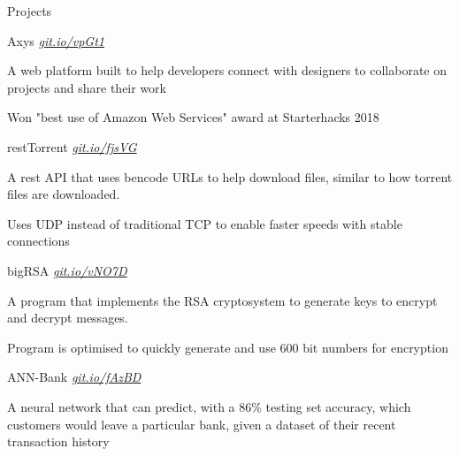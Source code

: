 \documentclass{resume} %
\begin{document}
\begin{rSection}{Projects}
  
  \begin{rSubsection}{Axys}
	  {\em {\href{https://github.com/MSJawad/AXYS}
		    {git.io/vpGt1}}}
	  {}

    \item A web platform built to help developers connect with designers to collaborate on projects and share their work
    \item Won "best use of Amazon Web Services" award at Starterhacks 2018
      
  \end{rSubsection}

	\begin{rSubsection}{restTorrent}
		{\em {\href{https://github.com/MSJawad/restTorrent}
				{git.io/fjsVG}}}
		{}
		
		\item A rest API that uses bencode URLs to help download files, similar to how torrent files are downloaded.
		\item Uses UDP instead of traditional TCP to enable faster speeds with stable connections
		
	\end{rSubsection}

  \begin{rSubsection}{bigRSA}
	  {\em {\href{https://github.com/MSJawad/bigRSA}
		    {git.io/vNO7D}}}
	  {}

    \item A program that implements the RSA cryptosystem to generate keys to encrypt and decrypt messages.
    \item Program is optimised to quickly generate and use 600 bit numbers for encryption
    
    \end{rSubsection}
    
   \begin{rSubsection}{ANN-Bank}
	  {\em {\href{https://github.com/MSJawad/ANN-Bank-Solutions}
		    {git.io/fAzBD}}}
	  {}

    \item A neural network that can predict, with a 86\% testing set accuracy, which customers would leave a particular bank, given a dataset of their recent transaction history
   

\end{rSubsection}
\end{rSection}
\end{document}
